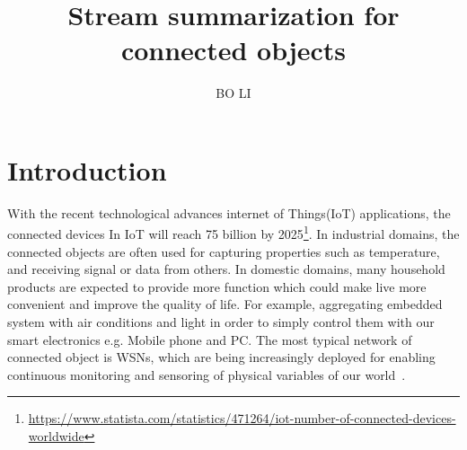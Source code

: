 \documentclass{report}
\title{Stream summarization for connected objects}
\author{BO LI }
\begin{document}
\maketitle

\chapter{Introduction}

With the recent technological advances internet of Things(IoT) applications, the connected devices In IoT will reach 75 billion by 2025\footnote{\url{ https://www.statista.com/statistics/471264/iot-number-of-connected-devices-worldwide}}. In industrial domains, the connected objects are often used for capturing properties such as temperature, and receiving signal or data from others. In domestic domains, many household products are expected to provide more function which could make live more convenient and improve the quality of life. For example, aggregating embedded system with air conditions and light in order to simply control them with our smart electronics e.g. Mobile phone and PC. The most typical network of connected object is WSNs, which are being increasingly deployed for enabling continuous monitoring and sensoring of physical variables of our world~\cite{li2016temporal}.
\end{document}
